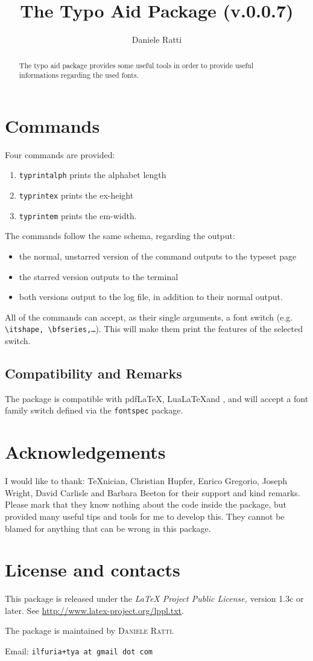\documentclass[a4paper]{article}
\author{Daniele Ratti}
\title{The Typo Aid Package (v.0.0.7)}
\begin{document}
\maketitle

\begin{abstract}
The typo aid package provides some useful tools in order to provide useful informations regarding the used fonts.
\end{abstract}
\section{Commands}
Four commands are provided:
\begin{enumerate}
\item \texttt{typrintalph} prints the alphabet length
\item \texttt{typrintex} prints the ex-height
\item\texttt{typrintem} prints the em-width.
\end{enumerate}

\noindent The commands follow the same schema, regarding the output:
\begin{itemize}
\item the normal, unstarred version of the command outputs to the typeset page
\item the starred version outputs to the terminal
\item both versions output to the log file, in addition to their normal output.
\end{itemize}
All of the commands can accept, as their single arguments, a font switch (e.g. \texttt{\textbackslash itshape, \textbackslash bfseries,\dots}). This will make them print the features of the selected switch.
\subsection{Compatibility and Remarks}
The package is compatible with pdf{}\LaTeX, Lua\LaTeX and \XeLaTeX, and will accept a font family switch defined via the \texttt{fontspec} package.
\section{Acknowledgements}
I would like to thank: \TeX nician, Christian Hupfer, Enrico Gregorio, Joseph Wright, David Carlisle and Barbara Beeton for their support and kind remarks. Please mark that they know nothing about the code inside the package, but provided many useful tips and tools for me to develop this. They cannot be blamed for anything that can be wrong in this package.
\section{License and contacts}
This package is released under the \emph{\LaTeX{} Project Public License,} version 1.3c or later. See \url{http://www.latex-project.org/lppl.txt}.

The package is maintained by \textsc{Daniele Ratti.} 

Email: \texttt{ilfuria+tya at gmail dot com}
\end{document}
